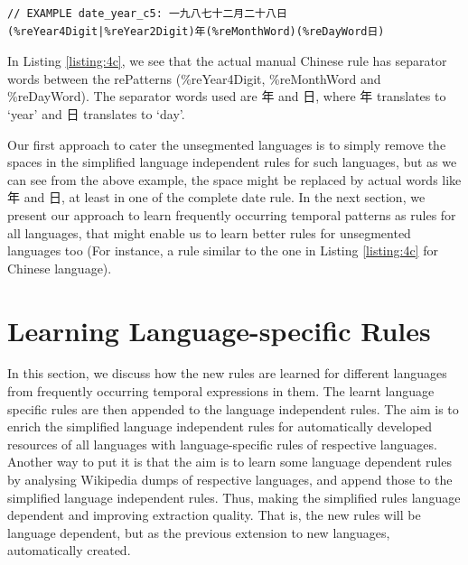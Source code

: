 \begin{minipage}{\linewidth}
\begin{lstlisting}
// EXAMPLE date_year_c5: 一九八七十二月二十八日
(%reYear4Digit|%reYear2Digit)年(%reMonthWord)(%reDayWord日)
\end{lstlisting}
\end{minipage}




In Listing \ref{listing:4c}, we see that the actual manual Chinese rule has separator words between the rePatterns (\%reYear4Digit, \%reMonthWord and \%reDayWord). The separator words used are 年 and 日, where 年 translates to `year' and 日 translates to `day'. 

Our first approach to cater the unsegmented languages is to simply remove the spaces in the simplified language independent rules for such languages, but as we can see from the above example, the space might be replaced by actual words like 年 and 日, at least in one of the complete date rule. In the next section, we present our approach to learn frequently occurring temporal patterns as rules for all languages, that might enable us to learn better rules for unsegmented languages too (For instance, a rule similar to the one in Listing \ref{listing:4c} for Chinese language). 

\section{Learning Language-specific Rules} \label{sec4d}
In this section, we discuss how the new rules are learned for different languages from frequently occurring temporal expressions in them. The learnt language specific rules are then appended to the language independent rules. The aim is to enrich the simplified language independent rules for automatically developed resources of all languages with language-specific rules of respective languages. Another way to put it is that the aim is to learn some language dependent rules by analysing Wikipedia dumps of respective languages, and append those to the simplified language independent rules. Thus, making the simplified rules language dependent and improving extraction quality. That is, the new rules will be language dependent, but as the previous extension to new languages, automatically created.

